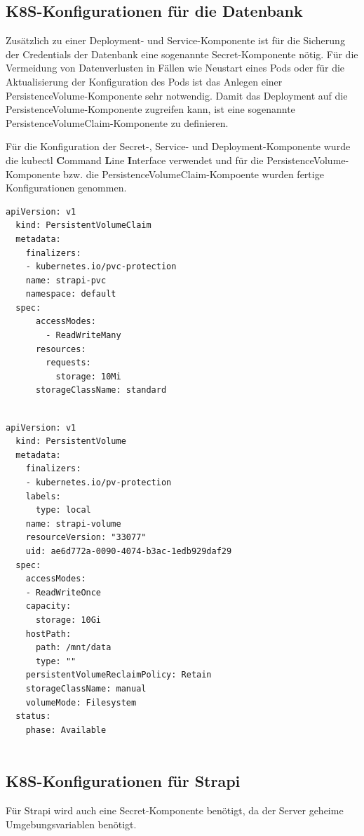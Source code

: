 \subsection{K8S-Konfigurationen für die Datenbank}
Zusätzlich zu einer Deployment- und Service-Komponente ist für die Sicherung
der Credentials der Datenbank eine sogenannte
Secret-Komponente nötig.
Für die Vermeidung von Datenverlusten in Fällen
wie Neustart eines Pods oder für die Aktualisierung
der Konfiguration des Pods ist
das Anlegen einer PersistenceVolume-Komponente sehr notwendig.
Damit das Deployment auf die PersistenceVolume-Komponente zugreifen kann, ist eine sogenannte PersistenceVolumeClaim-Komponente zu definieren.

Für die Konfiguration der Secret-, Service- und Deployment-Komponente wurde die kubectl \textbf{C}ommand \textbf{L}ine \textbf{I}nterface verwendet
und für die PersistenceVolume-Komponente bzw. die PersistenceVolumeClaim-Kompoente wurden fertige Konfigurationen genommen.
\begin{lstlisting}[caption=K8S PVC]
  apiVersion: v1
  kind: PersistentVolumeClaim
  metadata:
    finalizers:
    - kubernetes.io/pvc-protection
    name: strapi-pvc
    namespace: default
  spec:
      accessModes:
        - ReadWriteMany
      resources:
        requests:
          storage: 10Mi
      storageClassName: standard
    
\end{lstlisting}


\begin{lstlisting}[caption=K8S PV]
  apiVersion: v1
  kind: PersistentVolume
  metadata:
    finalizers:
    - kubernetes.io/pv-protection
    labels:
      type: local
    name: strapi-volume
    resourceVersion: "33077"
    uid: ae6d772a-0090-4074-b3ac-1edb929daf29
  spec:
    accessModes:
    - ReadWriteOnce
    capacity:
      storage: 10Gi
    hostPath:
      path: /mnt/data
      type: ""
    persistentVolumeReclaimPolicy: Retain
    storageClassName: manual
    volumeMode: Filesystem
  status:
    phase: Available
    
\end{lstlisting}



\subsection{K8S-Konfigurationen für Strapi}
Für Strapi wird auch eine Secret-Komponente benötigt, da der Server geheime Umgebungsvariablen benötigt.

